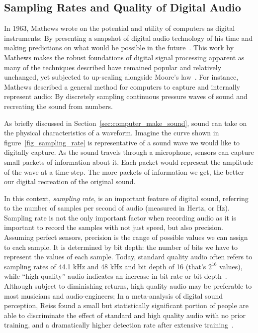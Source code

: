 \documentclass[\main/thesis.tex]{subfiles}
\begin{document}
\subsection{Sampling Rates and Quality of Digital Audio}
\label{sec_sampling_rates}
In 1963, Mathews wrote on the potential and utility of computers as digital instruments; By presenting a snapshot of digital audio technology of his time and making predictions on what would be possible in the future~\cite{mathews1963digital}. This work by Mathews makes the robust foundations of digital signal processing apparent as many of the techniques described have remained popular and relatively unchanged, yet subjected to up-scaling alongside Moore's law~\cite{mack2011fifty,smith1991viewpoints}. For instance, Mathews described a general method for computers to capture and internally represent audio: By discretely sampling continuous pressure waves of sound and recreating the sound from numbers. 

As briefly discussed in Section~\ref{sec:computer_make_sound}, sound can take on the physical characteristics of a waveform. Imagine the curve shown in figure~\ref{fig_sampling_rate} is representative of a sound wave we would like to digitally capture. As the sound travels through a microphone, sensors can capture small packets of information about it. Each packet would represent the amplitude of the wave at a time-step. The more packets of information we get, the better our digital recreation of the original sound.

In this context, \textit{sampling rate}, is an important feature of digital sound, referring to the number of samples per second of audio (measured in Hertz, or Hz). Sampling rate is not the only important factor when recording audio as it is important to record the samples with not just speed, but also precision. Assuming perfect sensors, precision is the range of possible values we can assign to each sample. It is determined by bit depth: the number of bits we have to represent the values of each sample.  Today, standard quality audio often refers to sampling rates of 44.1 kHz and 48 kHz and bit depth of 16 (that's $2^{16}$ values), while \enquote{high quality} audio indicates an increase in bit rate or bit depth~\cite{reiss2016meta}. Although subject to diminishing returns, high quality audio may be preferable to most musicians and audio-engineers; In a meta-analysis of digital sound perception, Reiss found a small but statistically significant portion of people are able to discriminate the effect of standard and high quality audio with no prior training, and a dramatically higher detection rate after extensive training~\cite{reiss2016meta}. 
\end{document}
